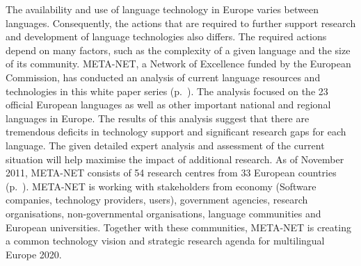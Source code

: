 \begin{Parallel}[c]{78mm}{78mm}
{The availability and use of language technology in Europe varies between languages. Consequently, the actions that are required to further support research and development of language technologies also differs. The required actions depend on many factors, such as the complexity of a given language and the size of its community. META-NET, a Network of Excellence funded by the European Commission, has conducted an  analysis of current language resources and technologies in this white paper series (p.~\pageref{whitepaperseries}). The analysis focused on the 23 official European languages as well as other important national and regional languages in Europe. The results of this analysis suggest that there are tremendous deficits in technology support and significant research gaps for each language. The given detailed expert analysis and assessment of the current situation will help maximise the impact of additional research. As of November 2011, META-NET consists of 54 research centres from 33 European countries (p.~\pageref{metanetmembers}). META-NET is working with stakeholders from economy (Software companies, technology providers, users), government agencies, research organisations, non-governmental organisations, language communities and European universities. Together with these communities, META-NET is creating a common technology vision and strategic research agenda for multilingual Europe 2020.} 
\ParallelPar
\end{Parallel}



\makefundingnotice
\cleardoublepage

\renewcommand\contentsname{}
\tableofcontents



\cleardoublepage

\setcounter{page}{1}
\pagestyle{scrheadings}



